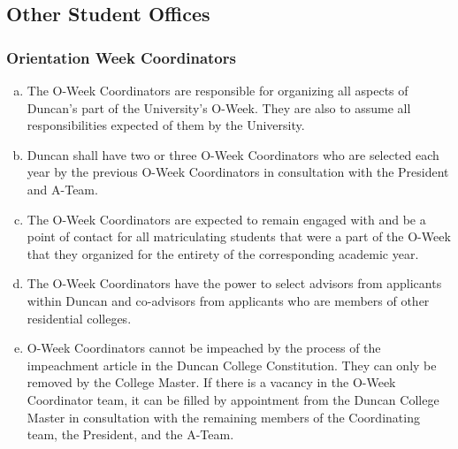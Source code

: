 \documentclass[USletter,12pt]{article}
\begin{document}
\subsection{Other Student Offices}


\subsubsection{Orientation Week Coordinators}
\begin{enumerate}[(a)]
\item The O-Week Coordinators are responsible for organizing all aspects of Duncan's part of the University's O-Week.  They are also to assume all responsibilities expected of them by the University.
\item Duncan shall have two or three O-Week Coordinators who are selected each year by the previous O-Week Coordinators in consultation with the President and A-Team.
\item The O-Week Coordinators are expected to remain engaged with and be a point of contact for all matriculating students that were a part of the O-Week that they organized for the entirety of the corresponding academic year.
\item The O-Week Coordinators have the power to select advisors from applicants within Duncan and co-advisors from applicants who are members of other residential colleges.
\item O-Week Coordinators cannot be impeached by the process of the impeachment article in the Duncan College Constitution.  They can only be removed by the College Master.  If there is a vacancy in the O-Week Coordinator team, it can be filled by appointment from the Duncan College Master in consultation with the remaining members of the Coordinating team, the President, and the A-Team.
\end{enumerate}
\end{document}
